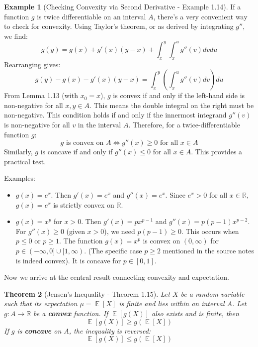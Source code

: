 \documentclass[11pt]{article}
\newtheorem{theorem}{Theorem}[section]
\theoremstyle{definition}
\newtheorem{example}[theorem]{Example}
\theoremstyle{remark}
\DeclareMathOperator{\E}{\mathbb{E}} %
\newcommand{\R}{\mathbb{R}} %
\begin{document}
\begin{example}[Checking Convexity via Second Derivative - Example 1.14]
If a function $g$ is twice differentiable on an interval $A$, there's a very convenient way to check for convexity. Using Taylor's theorem, or as derived by integrating $g''$, we find:
\[ g(y) = g(x) + g'(x)(y-x) + \int_{x}^{y} \int_{x}^{u} g''(v) dv du \]
Rearranging gives:
\[ g(y) - g(x) - g'(x)(y-x) = \int_{x}^{y} \left( \int_{x}^{u} g''(v) dv \right) du \]
From Lemma 1.13 (with $x_0=x$), $g$ is convex if and only if the left-hand side is non-negative for all $x, y \in A$. This means the double integral on the right must be non-negative. This condition holds if and only if the innermost integrand $g''(v)$ is non-negative for all $v$ in the interval $A$.
Therefore, for a twice-differentiable function $g$:
\[
g \text{ is convex on } A \iff g''(x) \ge 0 \text{ for all } x \in A
\]
Similarly, $g$ is concave if and only if $g''(x) \le 0$ for all $x \in A$. This provides a practical test.

Examples:
\begin{itemize}
    \item $g(x) = e^x$. Then $g'(x) = e^x$ and $g''(x) = e^x$. Since $e^x > 0$ for all $x \in \R$, $g(x)=e^x$ is strictly convex on $\R$.
    \item $g(x) = x^p$ for $x > 0$. Then $g'(x) = px^{p-1}$ and $g''(x) = p(p-1)x^{p-2}$. For $g''(x) \ge 0$ (given $x>0$), we need $p(p-1) \ge 0$. This occurs when $p \le 0$ or $p \ge 1$. The function $g(x)=x^p$ is convex on $(0, \infty)$ for $p \in (-\infty, 0] \cup [1, \infty)$. (The specific case $p \ge 2$ mentioned in the source notes is indeed convex). It is concave for $p \in [0, 1]$.
\end{itemize}
\end{example}

Now we arrive at the central result connecting convexity and expectation.

\begin{theorem}[Jensen's Inequality - Theorem 1.15]
Let $X$ be a random variable such that its expectation $\mu = \E[X]$ is finite and lies within an interval $A$. Let $g: A \to \R$ be a \textbf{convex} function. If $\E[g(X)]$ also exists and is finite, then
\[
\E[g(X)] \ge g(\E[X])
\]
If $g$ is \textbf{concave} on $A$, the inequality is reversed:
\[
\E[g(X)] \le g(\E[X])
\]
\end{theorem}
\end{document}
